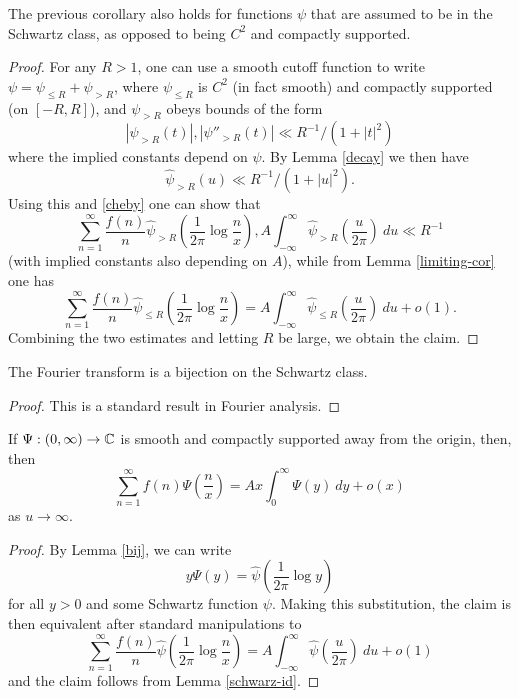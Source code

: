 \begin{lemma}\label{schwarz-id}  The previous corollary also holds for functions $\psi$ that are assumed to be in the Schwartz class, as opposed to being $C^2$ and compactly supported.
\end{lemma}

\begin{proof}
For any $R>1$, one can use a smooth cutoff function to write $\psi = \psi_{\leq R} + \psi_{>R}$, where $\psi_{\leq R}$ is $C^2$ (in fact smooth) and compactly supported (on $[-R,R]$), and $\psi_{>R}$ obeys bounds of the form
$$ |\psi_{>R}(t)|, |\psi''_{>R}(t)| \ll R^{-1} / (1 + |t|^2) $$
where the implied constants depend on $\psi$.  By Lemma \ref{decay} we then have
$$ \hat \psi_{>R}(u) \ll R^{-1} / (1+|u|^2).$$
Using this and \eqref{cheby} one can show that
$$ \sum_{n=1}^\infty \frac{f(n)}{n} \hat \psi_{>R}( \frac{1}{2\pi} \log \frac{n}{x} ), A \int_{-\infty}^\infty \hat \psi_{>R} (\frac{u}{2\pi})\ du \ll R^{-1} $$
(with implied constants also depending on $A$), while from Lemma \ref{limiting-cor} one has
$$ \sum_{n=1}^\infty \frac{f(n)}{n} \hat \psi_{\leq R}( \frac{1}{2\pi} \log \frac{n}{x} ) = A \int_{-\infty}^\infty \hat \psi_{\leq R} (\frac{u}{2\pi})\ du + o(1).$$
Combining the two estimates and letting $R$ be large, we obtain the claim.
\end{proof}

\begin{lemma}\label{bij}  The Fourier transform is a bijection on the Schwartz class.
\end{lemma}

\begin{proof}  This is a standard result in Fourier analysis.
\end{proof}

\begin{corollary}  If $\Psi: (0,\infty) \to \C$ is smooth and compactly supported away from the origin, then, then
$$ \sum_{n=1}^\infty f(n) \Psi( \frac{n}{x} ) = A x \int_0^\infty \Psi(y)\ dy + o(x)$$
as $u \to \infty$.
\end{corollary}

\begin{proof} By Lemma \ref{bij}, we can write
$$ y \Psi(y) = \hat \psi( \frac{1}{2\pi} \log y )$$
for all $y>0$ and some Schwartz function $\psi$.  Making this substitution, the claim is then equivalent after standard manipulations to
$$ \sum_{n=1}^\infty \frac{f(n)}{n} \hat \psi( \frac{1}{2\pi} \log \frac{n}{x} ) = A \int_{-\infty}^\infty \hat \psi(\frac{u}{2\pi})\ du + o(1)$$
and the claim follows from Lemma \ref{schwarz-id}.
\end{proof}

